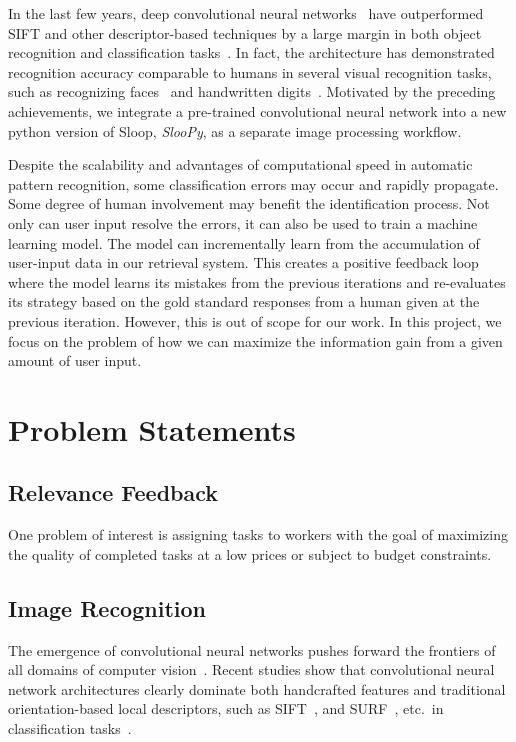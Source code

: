 In the last few years, deep convolutional neural networks~\cite{lecun95,
kriz12} have outperformed SIFT and other descriptor-based techniques by a large
margin in both object recognition and classification tasks~\cite{kriz12,
fisher14, ILSVRC15}. In fact, the architecture has demonstrated recognition
accuracy comparable to humans in several visual recognition tasks, such as
recognizing faces~\cite{deepface14} and handwritten digits~\cite{mnist13}.
Motivated by the preceding achievements, we integrate a pre-trained
convolutional neural network into a new python version of Sloop, \emph{SlooPy},
as a separate image processing workflow.

Despite the scalability and advantages of computational speed in automatic
pattern recognition, some classification errors may occur and rapidly
propagate. Some degree of human involvement may benefit the identification
process. Not only can user input resolve the errors, it can also be used to
train a machine learning model. The model can incrementally learn from the
accumulation of user-input data in our retrieval system. This creates a
positive feedback loop where the model learns its mistakes from the previous
iterations and re-evaluates its strategy based on the gold standard responses
from a human given at the previous iteration. However, this is out of scope
for our work. In this project, we focus on the problem of how we can maximize
the information gain from a given amount of user input.

\section{Problem Statements}

\subsection{Relevance Feedback} %
\label{sub:relevance_feedback}
One problem of interest is assigning tasks to workers with the goal of maximizing
the quality of completed tasks at a low prices or subject to budget
constraints.

\subsection{Image Recognition} %
\label{sub:image_recognition}
The emergence of convolutional neural networks pushes forward the frontiers of all
domains of computer vision~\cite{lecun95}. Recent studies show that
convolutional neural network architectures clearly dominate both handcrafted
features and traditional orientation-based local descriptors, such as
SIFT~\cite{lowe04}, and SURF~\cite{surf08}, etc.\ in classification
tasks~\cite{fisher14,kriz12,prelu15,ILSVRC15}.

